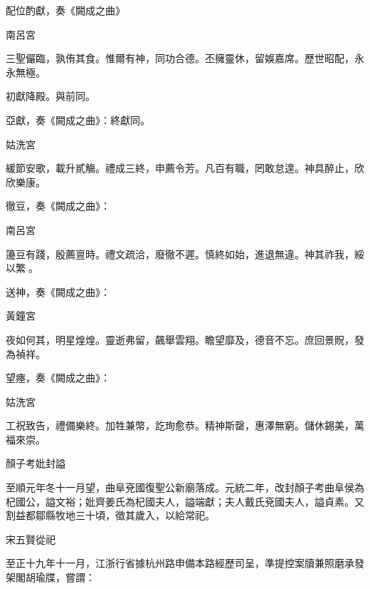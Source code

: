 \begin{pinyinscope}
 配位酌獻，奏《闕成之曲》



 南呂宮



 三聖儼臨，孰侑其食。惟爾有神，同功合德。丕擁靈休，留娛嘉席。歷世昭配，永永無極。



 初獻降殿。與前同。



 亞獻，奏《闕成之曲》：終獻同。



 姑洗宮



 緩節安歌，載升貳觴。禮成三終，申薦令芳。凡百有職，罔敢怠遑。神具醉止，欣欣樂康。



 徹豆，奏《闕成之曲》：



 南呂宮



 籩豆有踐，殷薦亶時。禮文疏洽，廢徹不遲。慎終如始，進退無違。神其祚我，綏以繁。



 送神，奏《闕成之曲》：



 黃鐘宮



 夜如何其，明星煌煌。靈逝弗留，飆舉雲翔。瞻望靡及，德音不忘。庶回景貺，發為禎祥。



 望瘞，奏《闕成之曲》：



 姑洗宮



 工祝致告，禮備樂終。加牲兼幣，訖珣愈恭。精神斯罄，惠澤無窮。儲休錫美，萬福來崇。



 顏子考妣封謚



 至順元年冬十一月望，曲阜兗國復聖公新廟落成。元統二年，改封顏子考曲阜侯為杞國公，謚文裕；妣齊姜氏為杞國夫人，謚端獻；夫人戴氏兗國夫人，謚貞素。又割益都鄒縣牧地三十頃，徵其歲入，以給常祀。



 宋五賢從祀



 至正十九年十一月，江浙行省據杭州路申備本路經歷司呈，準提控案牘兼照磨承發架閣胡瑜牒，嘗謂：




\end{pinyinscope}

